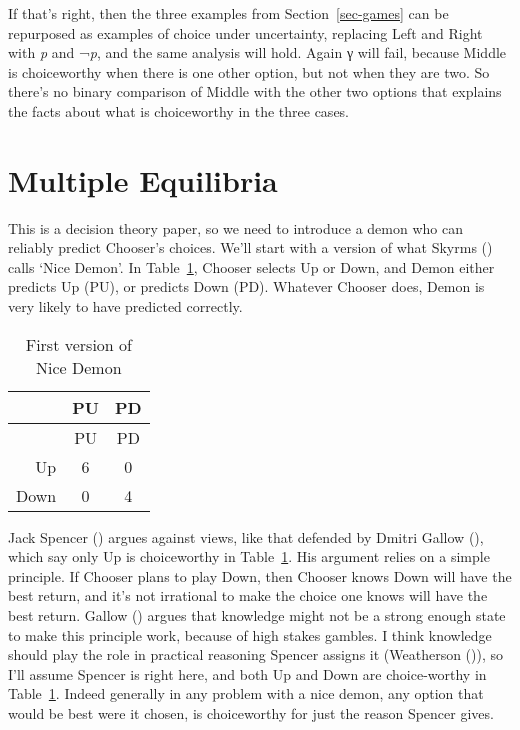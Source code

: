 \documentclass[
  11pt,
  letterpaper,
  DIV=11,
  numbers=noendperiod,
  twoside]{scrartcl}
\begin{document}
If that's right, then the three examples from Section~\ref{sec-games}
can be repurposed as examples of choice under uncertainty, replacing
Left and Right with \emph{p} and ¬\emph{p}, and the same analysis will
hold. Again γ will fail, because Middle is choiceworthy when there is
one other option, but not when they are two. So there's no binary
comparison of Middle with the other two options that explains the facts
about what is choiceworthy in the three cases.

\section{Multiple Equilibria}\label{sec-multieq}

This is a decision theory paper, so we need to introduce a demon who can
reliably predict Chooser's choices. We'll start with a version of what
Skyrms () calls `Nice Demon'. In
Table~\ref{tbl-nice-demon}, Chooser selects Up or Down, and Demon either
predicts Up (PU), or predicts Down (PD). Whatever Chooser does, Demon is
very likely to have predicted correctly.

\begin{longtable}[]{@{}rcc@{}}
\caption{First version of Nice
Demon}\label{tbl-nice-demon}\tabularnewline
\toprule\noalign{}
& PU & PD \\
\midrule\noalign{}
\endfirsthead
\toprule\noalign{}
& PU & PD \\
\midrule\noalign{}
\endhead
\bottomrule\noalign{}
\endlastfoot
Up & 6 & 0 \\
Down & 0 & 4 \\
\end{longtable}

Jack Spencer () argues against views,
like that defended by Dmitri Gallow (),
which say only Up is choiceworthy in Table~\ref{tbl-nice-demon}. His
argument relies on a simple principle. If Chooser plans to play Down,
then Chooser knows Down will have the best return, and it's not
irrational to make the choice one knows will have the best return.
Gallow () argues that knowledge might not
be a strong enough state to make this principle work, because of high
stakes gambles. I think knowledge should play the role in practical
reasoning Spencer assigns it (Weatherson
()), so I'll assume Spencer is right
here, and both Up and Down are choice-worthy in
Table~\ref{tbl-nice-demon}. Indeed generally in any problem with a nice
demon, any option that would be best were it chosen, is choiceworthy for
just the reason Spencer gives.
\end{document}
